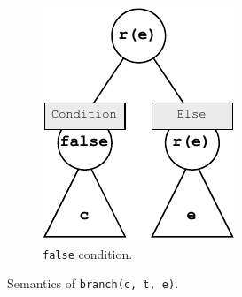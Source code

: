 \begin{figure}
    \begin{subfigure}[b]{0.40\textwidth}
        \centering
        \includegraphics[width=\textwidth]{figures/semantics/branch-false.pdf}
        \caption{\texttt{false} condition.}
        \label{fig:semantics-branch-false}
    \end{subfigure}
    \caption{Semantics of \texttt{branch(c, t, e)}.}
    \label{fig:semantics-branch}
\end{figure}


